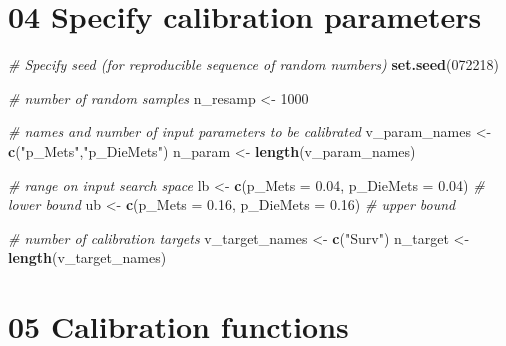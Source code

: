 \documentclass[
]{article}
\newenvironment{Shaded}{\begin{snugshade}}{\end{snugshade}}
\newcommand{\CommentTok}[1]{\textcolor[rgb]{0.56,0.35,0.01}{\textit{#1}}}
\newcommand{\DataTypeTok}[1]{\textcolor[rgb]{0.13,0.29,0.53}{#1}}
\newcommand{\DecValTok}[1]{\textcolor[rgb]{0.00,0.00,0.81}{#1}}
\newcommand{\FloatTok}[1]{\textcolor[rgb]{0.00,0.00,0.81}{#1}}
\newcommand{\KeywordTok}[1]{\textcolor[rgb]{0.13,0.29,0.53}{\textbf{#1}}}
\newcommand{\NormalTok}[1]{#1}
\newcommand{\StringTok}[1]{\textcolor[rgb]{0.31,0.60,0.02}{#1}}
\begin{document}
\hypertarget{specify-calibration-parameters}{%
\section{04 Specify calibration
parameters}\label{specify-calibration-parameters}}

\begin{Shaded}
\begin{Highlighting}[]
\CommentTok{# Specify seed (for reproducible sequence of random numbers)}
\KeywordTok{set.seed}\NormalTok{(}\DecValTok{072218}\NormalTok{)}

\CommentTok{# number of random samples}
\NormalTok{n_resamp <-}\StringTok{ }\DecValTok{1000}

\CommentTok{# names and number of input parameters to be calibrated}
\NormalTok{v_param_names <-}\StringTok{ }\KeywordTok{c}\NormalTok{(}\StringTok{"p_Mets"}\NormalTok{,}\StringTok{"p_DieMets"}\NormalTok{)}
\NormalTok{n_param <-}\StringTok{ }\KeywordTok{length}\NormalTok{(v_param_names)}

\CommentTok{# range on input search space}
\NormalTok{lb <-}\StringTok{ }\KeywordTok{c}\NormalTok{(}\DataTypeTok{p_Mets =} \FloatTok{0.04}\NormalTok{, }\DataTypeTok{p_DieMets =} \FloatTok{0.04}\NormalTok{) }\CommentTok{# lower bound}
\NormalTok{ub <-}\StringTok{ }\KeywordTok{c}\NormalTok{(}\DataTypeTok{p_Mets =} \FloatTok{0.16}\NormalTok{, }\DataTypeTok{p_DieMets =} \FloatTok{0.16}\NormalTok{) }\CommentTok{# upper bound}

\CommentTok{# number of calibration targets}
\NormalTok{v_target_names <-}\StringTok{ }\KeywordTok{c}\NormalTok{(}\StringTok{"Surv"}\NormalTok{)}
\NormalTok{n_target       <-}\StringTok{ }\KeywordTok{length}\NormalTok{(v_target_names)}
\end{Highlighting}
\end{Shaded}

\hypertarget{calibration-functions}{%
\section{05 Calibration functions}\label{calibration-functions}}
\end{document}
